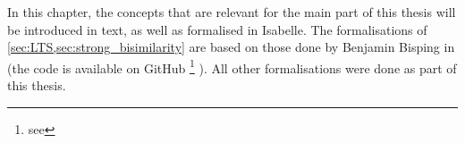 %
\begin{isabellebody}%
%
%
\isadelimtheory
%
\endisadelimtheory
%
\isatagtheory
%
\endisatagtheory
{\isafoldtheory}%
%
\isadelimtheory
%
\endisadelimtheory
%
\isadelimdocument
%
\endisadelimdocument
%
\isatagdocument
%
\isamarkuptrue%
%
\endisatagdocument
{\isafolddocument}%
%
\isadelimdocument
%
\endisadelimdocument
%
\begin{isamarkuptext}%
\label{chap:foundations}%
\end{isamarkuptext}\isamarkuptrue%
%
\begin{isamarkuptext}%
In this chapter, the concepts that are relevant for the main part of this thesis will be introduced in text, as well as formalised in Isabelle. The formalisations of \cref{sec:LTS,sec:strong_bisimilarity} are based on those done by Benjamin Bisping in \cite{bisping2019computing} (the code is available on GitHub%
\footnote{see }%
).
All other formalisations were done as part of this thesis.%
\end{isamarkuptext}\isamarkuptrue%
%
\isadelimtheory
%
\endisadelimtheory
%
\isatagtheory
%
\endisatagtheory
{\isafoldtheory}%
%
\isadelimtheory
%
\endisadelimtheory
%
\end{isabellebody}%
\endinput
